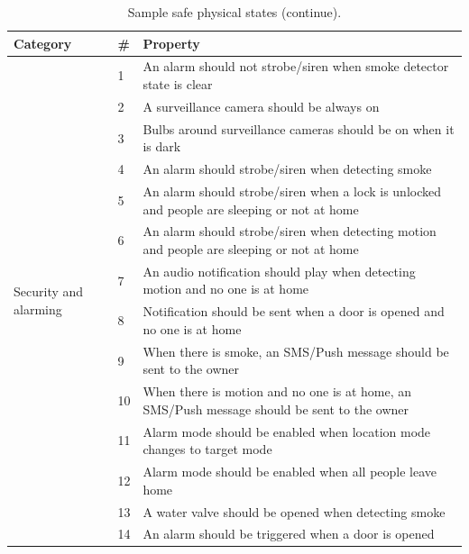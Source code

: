 \begin{table}[tb]
\ssp
\caption{Sample safe physical states (continue).}
\label{table:racescenarios1}
\centering
{
{\color{black}\begin{tabular}{| p{1.9cm} | p{0.5cm} | p{11.5cm} |}
\hline
\bf Category & \bf \# & \bf Property\\
\hline
\multirow{14}{1.9cm}{Security and alarming} & 1 & An alarm should not strobe/siren when smoke detector state is clear\\ \cline{2-3}
& 2 & A surveillance camera should be always on\\ \cline{2-3}
& 3 & Bulbs around surveillance cameras should be on when it is dark\\ \cline{2-3}
& 4 & An alarm should strobe/siren when detecting smoke\\ \cline{2-3}
& 5 & An alarm should strobe/siren when a lock is unlocked and people are sleeping or not at home\\ \cline{2-3}
& 6 & An alarm should strobe/siren when detecting motion and people are sleeping or not at home\\ \cline{2-3}
& 7 & An audio notification should play when detecting motion and no one is at home\\ \cline{2-3}
& 8 & Notification should be sent when a door is opened and no one is at home\\ \cline{2-3}
& 9 & When there is smoke, an SMS/Push message should be sent to the owner\\ \cline{2-3}
& 10 & When there is motion and no one is at home, an SMS/Push message should be sent to the owner\\ \cline{2-3}
& 11 & Alarm mode should be enabled when location mode changes to target mode\\ \cline{2-3}
& 12 & Alarm mode should be enabled when all people leave home\\ \cline{2-3}
& 13 & A water valve should be opened when detecting smoke\\ \cline{2-3}
& 14 & An alarm should be triggered when a door is opened\\ \cline{2-3}
\hline
\end{tabular}}
}
\end{table}

